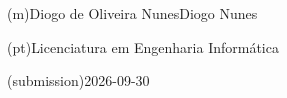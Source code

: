 %
%
\ntauthorname(m){Diogo de Oliveira Nunes}{Diogo Nunes}



%
%
%
\ntauthordegree(pt){Licenciatura em Engenharia Informática}



%
%
%

%
%
\ntdate(submission){2026-09-30}



